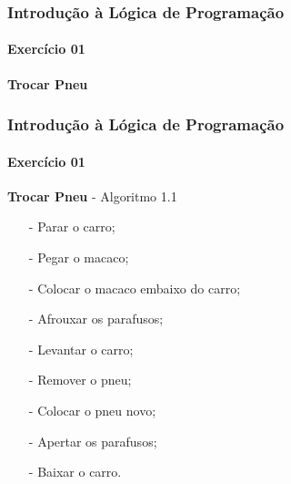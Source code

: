 
\begin{frame}
	\frametitle{Introdução à Lógica de Programação}
	\framesubtitle{Exercício 01}
	\begin{block}{\textbf{Trocar Pneu}}
	\end{block}
\end{frame}


\begin{frame}
	\frametitle{Introdução à Lógica de Programação}
	\framesubtitle{Exercício 01}
	\begin{block}{\textbf{Trocar Pneu} - Algoritmo 1.1}
	\begin{itemize}
		\item[-] Parar o carro;
		
		\item[-] Pegar o macaco;
		
		\item[-] Colocar o macaco embaixo do carro;
		
		\item[-] Afrouxar os parafusos;
		
		\item[-] Levantar o carro;
		
		\item[-] Remover o pneu;
		
		\item[-] Colocar o pneu novo;
		
		\item[-] Apertar os parafusos;
		
		\item[-] Baixar o carro.
		
	\end{itemize}
	\end{block}
\end{frame}